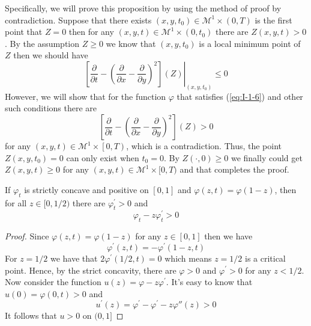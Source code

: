 Specifically, we will prove this proposition by using the method of proof by contradiction. Suppose that there exists $(x,y,t_0)\in\mathcal{M}^1\times (0,T)$ is the first point that $Z=0$ then for any $(x,y,t)\in\mathcal{M}^1\times (0,t_0)$ there are $Z(x,y,t)>0$. By the assumption $Z\ge 0$ we know that $(x,y,t_0)$ is a local minimum point of $Z$ then we should have
\begin{equation*}
    \left.\left[\frac{\partial}{\partial t}-{\left(\frac{\partial}{\partial x}-\frac{\partial}{\partial y}\right)}^2\right](Z)\right|_{(x,y,t_0)}\le 0
\end{equation*}
However, we will show that for the function $\varphi$ that satisfies (\ref{eq:I-1-6}) and other such conditions there are
\begin{equation}\label{eq:I-1-7}
    \left[\frac{\partial}{\partial t}-{\left(\frac{\partial}{\partial x}-\frac{\partial}{\partial y}\right)}^2\right](Z)>0
\end{equation}
for any $(x,y,t)\in\mathcal{M}^1\times\left[0,T\right)$, which is a contradiction. Thus, the point $Z(x,y,t_0)=0$ can only exist when $t_0=0$. By $Z(\cdot,0)\ge 0$ we finally could get $Z(x,y,t)\ge 0$ for any $(x,y,t)\in\mathcal{M}^1\times [0,T)$ and that completes the proof.
\begin{lemma}\label{lem:I-1-5}
    If $\varphi_t$ is strictly concave and positive on $[0,1]$ and $\varphi(z,t)=\varphi(1-z)$, then for all $z\in[0,1/2)$ there are $\varphi^\prime_t>0$ and
    \begin{equation}
        \varphi_t-z\varphi^\prime_t>0
    \end{equation}
\end{lemma}

\begin{proof}
    Since $\varphi(z,t)=\varphi(1-z)$ for any $z\in[0,1]$ then we have
    \begin{equation*}
        \varphi^\prime (z,t)=-\varphi^\prime(1-z,t)
    \end{equation*}
    For $z=1/2$ we have that $2\varphi^\prime(1/2,t)=0$ which means $z=1/2$ is a critical point. Hence, by the strict concavity, there are $\varphi>0$ and $\varphi^\prime>0$ for any $z<1/2$. Now consider the function $u(z)=\varphi-z\varphi^\prime$. It's easy to know that $u(0)=\varphi (0,t)>0$ and
    \begin{equation*}
        u^\prime(z)=\varphi^\prime-\varphi^\prime-z\varphi{''}(z)>0
    \end{equation*}
    It follows that $u>0$ on $(0,1]$
\end{proof}

